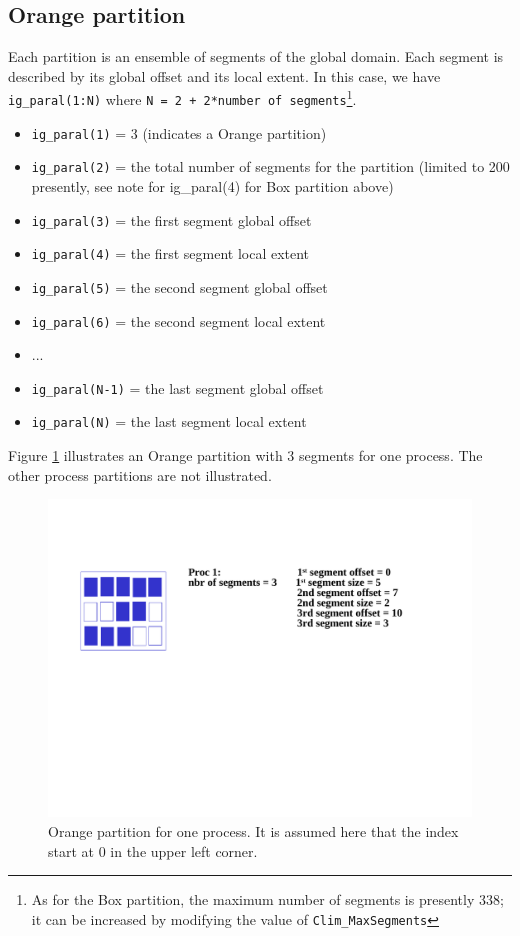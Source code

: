 \subsection{Orange partition}

Each partition is an ensemble of segments of the global domain. Each
segment is described by its global offset and its local extent.  In
this case, we have {\tt ig\_paral(1:N)} where {\tt N = 2 + 2*number of
segments}\footnote{As for the Box partition, the maximum number of
segments is presently 338; it can be increased by modifying the value
of {\tt Clim\_MaxSegments}}.

\begin{itemize}
 \item {\tt ig\_paral(1)} = 3 (indicates a Orange partition)
 \item {\tt ig\_paral(2)} = the total number of segments for the partition (limited to 200 presently, see note for ig\_paral(4) for Box partition above)
 \item {\tt ig\_paral(3)} = the first segment global offset
 \item {\tt ig\_paral(4)} = the first segment local extent
 \item {\tt ig\_paral(5)} = the second segment global offset
 \item {\tt ig\_paral(6)} = the second segment local extent
 \item ...
 \item {\tt ig\_paral(N-1)} = the last segment global offset
 \item {\tt ig\_paral(N)} = the last segment local extent
\end{itemize}

Figure \ref{orange_partition} illustrates an Orange partition with 3 segments
for one process. The other process partitions are not illustrated.

\begin{figure}
\includegraphics[scale=.6]{figures/orange_new} 
\caption{Orange partition for one process. It is assumed here that the index start at 0 in the upper left corner.}
\label{orange_partition}
\end{figure} 

